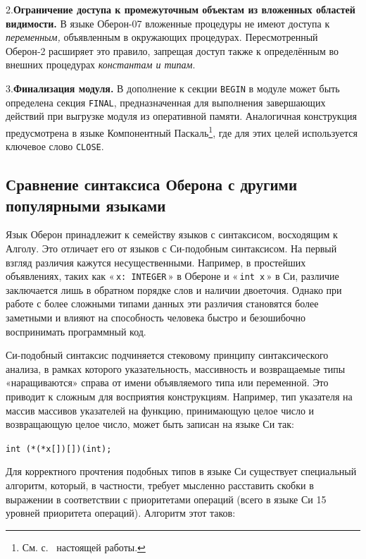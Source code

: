 \documentclass[utf8]{lgu}
\newcommand{\code}[1]{{\normalsize\texttt{#1}}}
\begin{document}
2.\hspace{0.5em}\textbf{Ограничение доступа к промежуточным объектам из вложенных областей видимости.} В языке Оберон-07 вложенные процедуры не имеют доступа к \textit{переменным,} объявленным в окружающих процедурах. Пересмотренный Оберон‑2 расширяет это правило, запрещая доступ также к определённым во внешних процедурах \textit{константам и типам}.

3.\hspace{0.5em}\textbf{Финализация модуля.} В дополнение к секции \code{BEGIN} в модуле может быть определена секция \code{FINAL}, предназначенная для выполнения завершающих действий при выгрузке модуля из оперативной памяти. Аналогичная конструкция предусмотрена в языке Компонентный Паскаль\footnote{См. с.~\pageref{lst:ComponentPascalClose} настоящей работы.}, где для этих целей используется ключевое слово \code{CLOSE}.

\subsection{Сравнение синтаксиса Оберона с другими популярными языками}

\firstparskip Язык Оберон принадлежит к семейству языков с синтаксисом, восходящим к Алголу. Это отличает его от языков с Си-подобным синтаксисом. На первый взгляд различия кажутся несущественными. Например, в простейших объявлениях, таких как «\,\code{x: INTEGER}\,» в Обероне и «\,\code{int x}\,» в Си, различие заключается лишь в обратном порядке слов и наличии двоеточия. Однако при работе с более сложными типами данных эти различия становятся более заметными и влияют на способность человека быстро и безошибочно воспринимать программный код.

Си-подобный синтаксис подчиняется стековому принципу синтаксического анализа, в рамках которого указательность, массивность и возвращаемые типы «наращиваются» справа от имени объявляемого типа или переменной. Это приводит к сложным для восприятия конструкциям. Например, тип указателя на массив массивов указателей на функцию, принимающую целое число и возвращающую целое число, может быть записан на языке Си так:

\begin{center}
\code{int (*(*x[])[])(int);}
\end{center}

Для корректного прочтения подобных типов в языке Си существует специальный алгоритм, который, в частности, требует мысленно расставить скобки в выражении в соответствии с приоритетами операций (всего в языке Си 15 уровней приоритета операций). Алгоритм этот таков:
\end{document}
